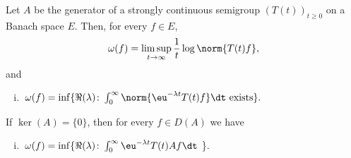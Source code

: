 \begin{theorem}\label{thm:a4-1.3}
Let $A$ be the generator of a strongly continuous semigroup $ (T(t))_{t \geq 0} $ on a Banach space $E$. 
Then, for every $f \in E$,
\begin{equation}\label{eq:a4-1.2}
\omega(f) = \limsup_{t \to \infty} \frac{1}{t}\log\norm{T(t)f}, 
\end{equation}
and
\begin{enumerate}[(i)]
\item 
$\,\omega(f) = \inf\{\Re(\lambda)\colon\int_{0}^{\infty} \norm{\eu^{-\lambda t} T(t)f}  \dt \text{ exists}\}.$
\end{enumerate}
If\/ $\ker(A) = \{0\}$, then for every $f \in D(A)$ we have
\begin{enumerate}[(i), resume]
\item 
$\,\omega(f) = \inf\{\Re(\lambda)\colon\int_{0}^{\infty} \eu^{-\lambda t} T(t)Af  \dt$
\}.
\end{enumerate}
\end{theorem}
